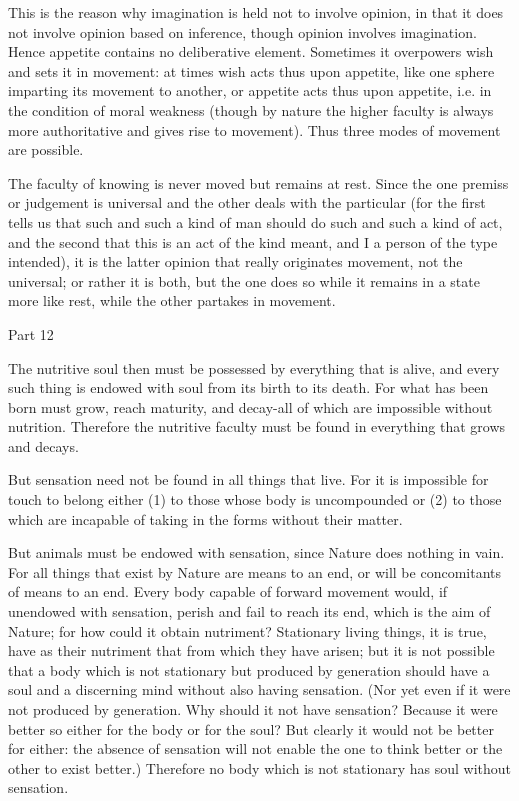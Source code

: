 This is the reason why imagination is held not to involve opinion,
in that it does not involve opinion based on inference, though opinion
involves imagination. Hence appetite contains no deliberative element.
Sometimes it overpowers wish and sets it in movement: at times wish
acts thus upon appetite, like one sphere imparting its movement to
another, or appetite acts thus upon appetite, i.e. in the condition
of moral weakness (though by nature the higher faculty is always more
authoritative and gives rise to movement). Thus three modes of movement
are possible. 

The faculty of knowing is never moved but remains at rest. Since the
one premiss or judgement is universal and the other deals with the
particular (for the first tells us that such and such a kind of man
should do such and such a kind of act, and the second that this is
an act of the kind meant, and I a person of the type intended), it
is the latter opinion that really originates movement, not the universal;
or rather it is both, but the one does so while it remains in a state
more like rest, while the other partakes in movement. 

Part 12

The nutritive soul then must be possessed by everything that is alive,
and every such thing is endowed with soul from its birth to its death.
For what has been born must grow, reach maturity, and decay-all of
which are impossible without nutrition. Therefore the nutritive faculty
must be found in everything that grows and decays. 

But sensation need not be found in all things that live. For it is
impossible for touch to belong either (1) to those whose body is uncompounded
or (2) to those which are incapable of taking in the forms without
their matter. 

But animals must be endowed with sensation, since Nature does nothing
in vain. For all things that exist by Nature are means to an end,
or will be concomitants of means to an end. Every body capable of
forward movement would, if unendowed with sensation, perish and fail
to reach its end, which is the aim of Nature; for how could it obtain
nutriment? Stationary living things, it is true, have as their nutriment
that from which they have arisen; but it is not possible that a body
which is not stationary but produced by generation should have a soul
and a discerning mind without also having sensation. (Nor yet even
if it were not produced by generation. Why should it not have sensation?
Because it were better so either for the body or for the soul? But
clearly it would not be better for either: the absence of sensation
will not enable the one to think better or the other to exist better.)
Therefore no body which is not stationary has soul without sensation.

